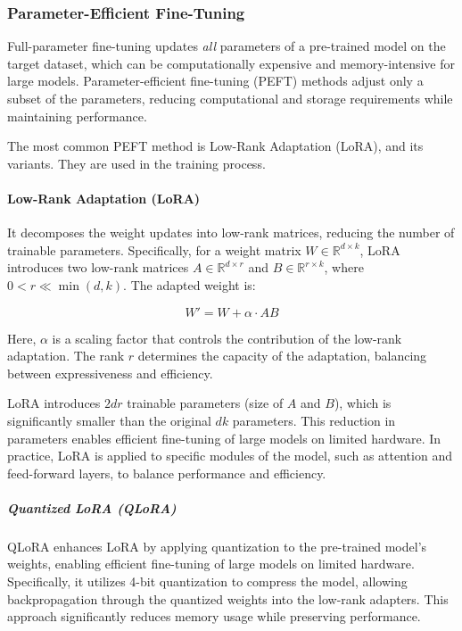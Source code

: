 \documentclass{article}
\newcounter{para}
\begin{document}
\subsubsection{Parameter-Efficient Fine-Tuning} \label{sec:peft}
Full-parameter fine-tuning updates \textit{all} parameters of a pre-trained model on the target dataset, which can be computationally expensive and memory-intensive for large models. Parameter-efficient fine-tuning (PEFT) methods adjust only a subset of the parameters, reducing computational and storage requirements while maintaining performance.

The most common PEFT method is Low-Rank Adaptation (LoRA), and its variants. They are used in the training process.

\paragraph{Low-Rank Adaptation (LoRA)} \label{sec:pre-lora}
It decomposes the weight updates into low-rank matrices, reducing the number of trainable parameters. Specifically, for a weight matrix \( W \in \mathbb{R}^{d \times k} \), LoRA introduces two low-rank matrices \( A \in \mathbb{R}^{d \times r} \) and \( B \in \mathbb{R}^{r \times k} \), where \( 0 < r \ll \min(d, k) \). The adapted weight is:

\[
W' = W + \alpha \cdot A B
\]

Here, \( \alpha \) is a scaling factor that controls the contribution of the low-rank adaptation. The rank \( r \) determines the capacity of the adaptation, balancing between expressiveness and efficiency.

LoRA introduces \( 2dr \) trainable parameters (size of \( A \) and \( B \)), which is significantly smaller than the original \( dk \) parameters. This reduction in parameters enables efficient fine-tuning of large models on limited hardware. In practice, LoRA is applied to specific modules of the model, such as attention and feed-forward layers, to balance performance and efficiency.

\subparagraph{Quantized LoRA (QLoRA)} \label{sec:pre-qlora}

QLoRA enhances LoRA by applying quantization to the pre-trained model's weights, enabling efficient fine-tuning of large models on limited hardware. Specifically, it utilizes 4-bit quantization to compress the model, allowing backpropagation through the quantized weights into the low-rank adapters. This approach significantly reduces memory usage while preserving performance.
\end{document}
